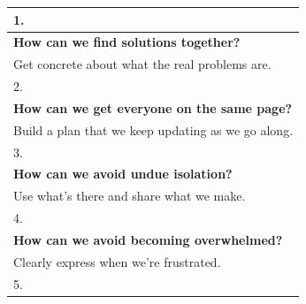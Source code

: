 \begin{refsection}
\begin{table}
{\footnotesize
{}
\begin{tabularx}{\textwidth}{|C|}
\hline
\vspace{-.4em} \color{Black} 1. \vspace{.25em}\\
\hline
\vspace{.01em}
\textbf{How can we find solutions together?}\\
Get concrete about what the real problems are.
\vspace{.4em}\\
\hline 
\vspace{-.4em} \color{Black} 2. \vspace{.4em}\\
\hline
\vspace{.01em}
\textbf{How can we get everyone on the same page?}\\
Build a plan that we keep updating as we go along.
\vspace{.4em}\\
\hline
\vspace{-.4em} \color{Black} 3. \vspace{.4em}\\
\hline
\vspace{.01em}
\textbf{How can we avoid undue isolation?}\\
Use what's there and share what we make.
\vspace{.4em}\\
\hline
\vspace{-.4em} \color{Black} 4. \vspace{.4em}\\
\hline
\vspace{.01em}
\textbf{How can we avoid becoming overwhelmed?}\\
Clearly express when we're frustrated.
\vspace{.4em}\\
\hline
\vspace{-.4em} \color{Black} 5. \vspace{.4em}\\
\hline

\end{tabularx}}
\end{table}
\end{refsection}

